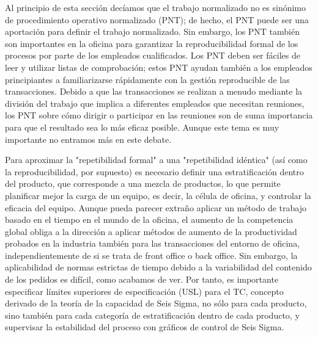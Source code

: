 Al principio de esta sección decíamos que el trabajo normalizado no es sinónimo de procedimiento operativo normalizado (PNT); de hecho, el PNT puede ser una aportación para definir el trabajo normalizado.
Sin embargo, los PNT también son importantes en la oficina para garantizar la reproducibilidad formal de los procesos por parte de los empleados cualificados.
Los PNT deben ser fáciles de leer y utilizar listas de comprobación; estos PNT ayudan también a los empleados principiantes a familiarizarse rápidamente con la gestión reproducible de las transacciones.
Debido a que las transacciones se realizan a menudo mediante la división del trabajo que implica a diferentes empleados que necesitan reuniones, los PNT sobre cómo dirigir o participar en las reuniones son de suma importancia para que el resultado sea lo más eficaz posible.
Aunque este tema es muy importante no entramos más en este debate.

Para aproximar la "repetibilidad formal" a una "repetibilidad idéntica" (así como la reproducibilidad, por supuesto) es necesario definir una estratificación dentro del producto, que corresponde a una mezcla de productos, lo que permite planificar mejor la carga de un equipo, es decir, la célula de oficina, y controlar la eficacia del equipo.
Aunque pueda parecer extraño aplicar un método de trabajo basado en el tiempo en el mundo de la oficina, el aumento de la competencia global obliga a la dirección a aplicar métodos de aumento de la productividad probados en la industria también para las transacciones del entorno de oficina, independientemente de si se trata de front office o back office.
Sin embargo, la aplicabilidad de normas estrictas de tiempo debido a la variabilidad del contenido de los pedidos es difícil, como acabamos de ver.
Por tanto, es importante especificar límites superiores de especificación (USL) para el TC, concepto derivado de la teoría de la capacidad de Seis Sigma, no sólo para cada producto, sino también para cada categoría de estratificación dentro de cada producto, y supervisar la estabilidad del proceso con gráficos de control de Seis Sigma.